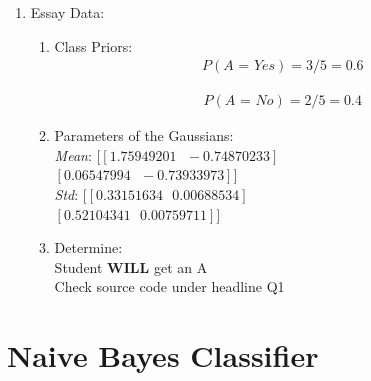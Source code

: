 \documentclass[12pt]{article}
\begin{document}
\begin{enumerate}
\begin{enumerate}
			
		\end{enumerate}
		

		
		
		\item Essay Data:\\
		
		\begin{enumerate}
			
			\item Class Priors:\\
			
			\begin{equation}
				\begin{split}
					P(\textit{A = Yes}) = 3/5 = 0.6
				\end{split}
			\end{equation}
		
			\begin{equation}
				\begin{split}
					P(\textit{A = No}) = 2/5 = 0.4
				\end{split}
			\end{equation}
			
			
			
			\item Parameters of the Gaussians:\\
			
			\textit{Mean}: $[[ 1.75949201\ \ \ -0.74870233]$\\
			$[ 0.06547994\ \ \ -0.73933973]]$ \\
			
			\textit{Std}: $[[0.33151634\ \ \ 0.00688534]$\\
			$[0.52104341\ \ \ 0.00759711]]$ \\
			
			\item Determine:\\
			
			Student \textbf{WILL} get an A \\
			Check source code under headline Q1 
			
		\end{enumerate}
		
		
	\end{enumerate}
	
	
	\section{Naive Bayes Classifier}
	
\end{document}
